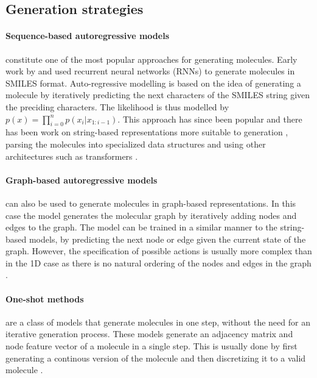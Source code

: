 \subsection{Generation strategies}
\paragraph{Sequence-based autoregressive models} constitute one of the most popular approaches
for generating molecules. Early work by \citep{seglerGeneratingFocusedMolecule2018} and
\citep{gomez-bombarelliAutomaticChemicalDesign2018} used recurrent neural networks (RNNs) to generate
molecules in SMILES format. Auto-regressive modelling is based on the idea of generating a molecule
by iteratively predicting the next characters of the SMILES string given the preciding characters.
The likelihood is thus modelled by $p(x) = \prod_{i=0}^n p(x_i | x_{1:i-1})$.
This approach has since been popular and there has been work on string-based representations more
suitable to generation \citep{oboyleDeepSMILESAdaptationSMILES2018,krennSelfReferencingEmbeddedStrings2020},
parsing the molecules into specialized data structures \citep{kusnerGrammarVariationalAutoencoder2017,jinJunctionTreeVariational2018}
and using other architectures \citep{todo} such as transformers \citep{vaswaniAttentionAllYou2017}.

\paragraph{Graph-based autoregressive models} can also be used to generate molecules in graph-based
representations. In this case the model generates the molecular graph by iteratively adding nodes
and edges to the graph. The model can be trained in a similar manner to the string-based models, by
predicting the next node or edge given the current state of the graph. However, the specification of
possible actions is usually more complex than in the 1D case as there is no natural ordering of the
nodes and edges in the graph \citep{todo}.

\paragraph{One-shot methods} are a class of models that generate molecules in one step, without the
need for an iterative generation process. These models generate an adjacency matrix and node feature
vector of a molecule in a single step. This is usually done by first generating a continous
version of the molecule and then discretizing it to a valid molecule \citep{todo}.

